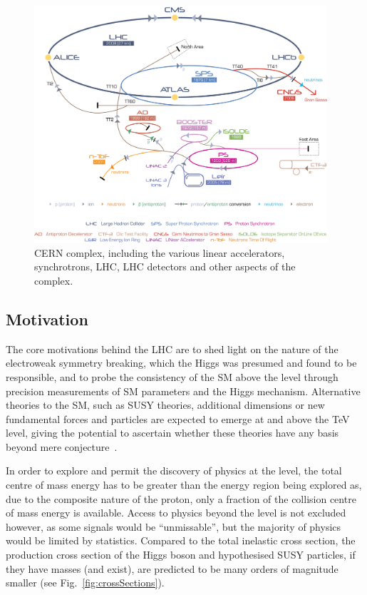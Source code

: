 \begin{figure}[htbp]
\begin{center}
\includegraphics[width=0.97\textwidth]{figs/lhc/Cern-Accelerator-Complex.jpg}
\caption{CERN complex, including the various linear accelerators, synchrotrons, LHC, LHC detectors and other aspects of the complex.}
\label{fig:cern-accelerator-complex}
\end{center}
\end{figure}

\subsection{Motivation}
The core motivations behind the LHC are to shed light on the nature of the electroweak symmetry breaking, which the Higgs was presumed and found to be responsible, and to probe the consistency of the SM above the \TeV level through precision measurements of SM parameters and the Higgs mechanism.
Alternative theories to the SM, such as SUSY theories, additional dimensions or new fundamental forces and particles are expected to emerge at and above the TeV level, giving the potential to ascertain whether these theories have any basis beyond mere conjecture~\cite{Bayatian:2006zz}.

In order to explore and permit the discovery of physics at the \TeV level, the total centre of mass energy has to be greater than the energy region being explored as, due to the composite nature of the proton, only a fraction of the collision centre of mass energy is available.
Access to physics beyond the \TeV level is not excluded	however, as some signals would be ``unmissable'', but the majority of physics would be limited by statistics.
Compared to the total inelastic cross section, the production cross section of the Higgs boson and hypothesised SUSY particles, if they have \TeV masses (and exist), are predicted to be many orders of magnitude smaller (see Fig.~\ref{fig:crossSections}).


